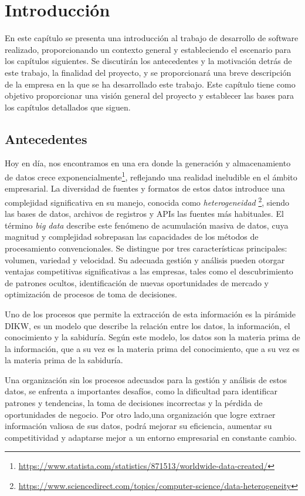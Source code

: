 \chapter{Introducción}\label{chap:intro}
En este capítulo se presenta una introducción al trabajo de desarrollo de software realizado,
proporcionando un contexto general y estableciendo el escenario para los capítulos siguientes.
Se discutirán los antecedentes y la motivación detrás de este trabajo, la finalidad del proyecto,
y se proporcionará una breve descripción de la empresa en la que se ha desarrollado este trabajo.
Este capítulo tiene como objetivo proporcionar una visión general del proyecto y establecer las
bases para los capítulos detallados que siguen.

\section{Antecedentes}\label{sec:antecedentes}
Hoy en día, nos encontramos en una era donde la generación y almacenamiento de datos crece
exponencialmente\footnote{\url{https://www.statista.com/statistics/871513/worldwide-data-created/}},
reflejando una realidad ineludible en el ámbito empresarial. La diversidad de fuentes y formatos de
estos datos introduce una complejidad significativa en su manejo, conocida como \textit{heterogeneidad}
\footnote{\url{https://www.sciencedirect.com/topics/computer-science/data-heterogeneity}}, siendo las
bases de datos, archivos de registros y APIs las fuentes más habituales.
El término \textit{big data} describe este fenómeno de acumulación masiva de datos, cuya magnitud y
complejidad sobrepasan las capacidades de los métodos de procesamiento convencionales. Se distingue
por tres características principales: volumen, variedad y velocidad. Su adecuada gestión y análisis
pueden otorgar ventajas competitivas significativas a las empresas, tales como el descubrimiento de
patrones ocultos, identificación de nuevas oportunidades de mercado y optimización de procesos de toma
de decisiones.

Uno de los procesos que permite la extracción de esta información es la pirámide DIKW, \cite{enwiki:1211227190}
es un modelo que describe la relación entre los datos, la información, el conocimiento y la sabiduría.
Según este modelo, los datos son la materia prima de la información, que a su vez es la materia prima
del conocimiento, que a su vez es la materia prima de la sabiduría.

Una organización sin los procesos adecuados para la gestión y análisis de estos datos, se enfrenta a
importantes desafíos, como la dificultad para identificar patrones y tendencias, la toma de decisiones
incorrectas y la pérdida de oportunidades de negocio. Por otro lado,una organización que logre extraer
información valiosa de sus datos, podrá mejorar su eficiencia, aumentar su competitividad y adaptarse
mejor a un entorno empresarial en constante cambio.


